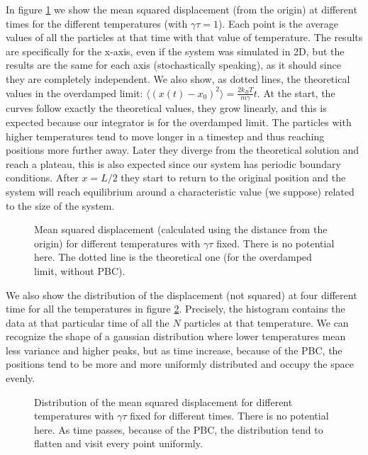 \documentclass[../main.tex]{subfiles}
\begin{document}
\noindent In figure \ref{fig: ex_11_V0_temps} we show the mean squared displacement (from the origin) at different times for the different temperatures (with $\gamma \tau=1$). Each point is the average values of all the particles at that time with that value of temperature. The results are specifically for the x-axis, even if the system was simulated in 2D, but the results are the same for each axis (stochastically speaking), as it should since they are completely independent. We also show, as dotted lines, the theoretical values in the overdamped limit: $\langle (x(t)-x_0)^2\rangle = \frac{2k_B T}{m \gamma}t$. At the start, the curves follow exactly the theoretical values, they grow linearly, and this is expected because our integrator is for the overdamped limit. The particles with higher temperatures tend to move longer in a timestep and thus reaching positions more further away. Later they diverge from the theoretical solution and reach a plateau, this is also expected since our system has periodic boundary conditions. After $x=L/2$ they start to return to the original position and the system will reach equilibrium around a characteristic value (we suppose) related to the size of the system.


\begin{figure}[!ht]
    \centering
    \begin{subfigure}{.85\textwidth}
        \centering
        
    \end{subfigure}
    \caption{Mean squared displacement (calculated using the distance from the origin) for different temperatures with $\gamma\tau$ fixed. There is no potential here. The dotted line is the theoretical one (for the overdamped limit, without PBC).}
    \label{fig: ex_11_V0_temps}
\end{figure}

We also show the distribution of the displacement (not squared) at four different time for all the temperatures in figure \ref{fig: ex_11_V0_temps_distr}. Precisely, the histogram contains the data at that particular time of all the $N$ particles at that temperature. We can recognize the shape of a gaussian distribution where lower temperatures mean less variance and higher peaks, but as time increase, because of the PBC, the positions tend to be more and more uniformly distributed and occupy the space evenly.

\begin{figure}[!ht]
    \centering
    \begin{subfigure}{.95\textwidth}
        \centering
        
    \end{subfigure}
    \caption{Distribution of the mean squared displacement for different temperatures with $\gamma\tau$ fixed for different times. There is no potential here. As time passes, because of the PBC, the distribution tend to flatten and visit every point uniformly.}
    \label{fig: ex_11_V0_temps_distr}
\end{figure}
\end{document}
